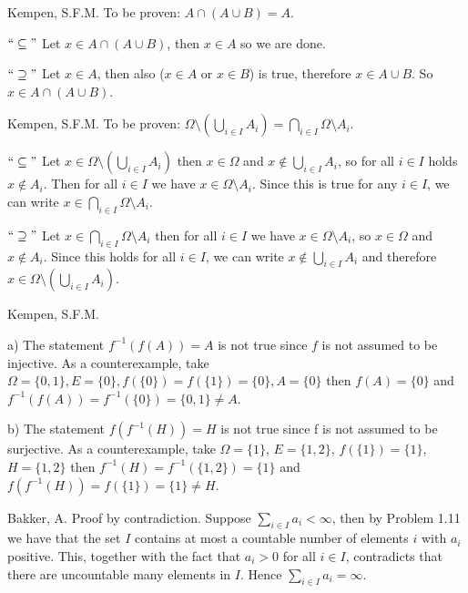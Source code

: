 \begin{solution}[1.2]{Kempen, S.F.M.} To be proven: $A\cap (A\cup B) = A$. 

\noindent $``\subseteq"$ Let $x\in A\cap (A\cup B)$, then $x\in A$ so we are done.

\noindent $``\supseteq"$ Let $x\in A$, then also ($x\in A$ or $x\in B$) is true, therefore $x\in A\cup B$. So $x\in A\cap (A\cup B)$. 
\end{solution}

\begin{solution}[1.5]{Kempen, S.F.M.} To be proven: $\Omega \setminus \left(\bigcup_{i\in I} A_i \right) = \bigcap_{i\in I} \Omega \setminus A_i$. 

\noindent $``\subseteq"$ Let $x\in \Omega \setminus \left(\bigcup_{i\in I} A_i \right)$ then $x\in \Omega$ and $x\notin \bigcup_{i\in I} A_i$, so for all $i \in I $ holds $x\notin A_i$. Then for all $i \in I$ we have $x\in \Omega\setminus A_i$. Since this is true for any $i\in I$, we can write $x\in \bigcap_{i\in I} \Omega \setminus A_i$. 

\noindent $``\supseteq"$ Let $x\in \bigcap_{i\in I} \Omega \setminus A_i$ then for all $i\in I$ we have $x\in \Omega\setminus A_i$, so $x\in \Omega$ and $x\notin A_i$. Since this holds for all $i\in I$, we can write $x\notin \bigcup_{i\in I} A_i $ and therefore $x\in \Omega \setminus \left(\bigcup_{i\in I} A_i \right)$.
\end{solution}

\begin{solution}[1.8]{Kempen, S.F.M.} 
    
\noindent a) The statement $f^{-1}(f(A)) = A$ is not true since $f$ is not assumed to be injective. As a counterexample, take $\Omega = \{0,1\}, E = \{0\}, f(\{0\}) = f(\{1\}) = \{0\}, A = \{0\}$ then $f(A) = \{0\}$ and $f^{-1}(f(A)) = f^{-1}(\{0\}) = \{0,1\} \neq A$.

\noindent b) The statement $f(f^{-1}(H)) = H$ is not true since f is not assumed to be surjective. As a counterexample, take $\Omega = \{1\}$, $E = \{1,2\}$, $f(\{1\}) = \{1\}$, $H = \{1,2\}$ then $f^{-1}(H) = f^{-1}(\{1,2\}) = \{1\}$ and $f(f^{-1}(H)) = f(\{1\}) = \{1\} \neq H$.
\end{solution}

\begin{solution}[1.12]{Bakker, A.}
	Proof by contradiction. Suppose $\sum_{i\in I}a_i < \infty$, then by Problem 1.11 we have that the set $I$ contains at most a countable number of elements $i$ with $a_i$ positive. This, together with the fact that $a_i>0$ for all $i\in I$, contradicts that there are uncountable many elements in $I$. Hence  $\sum_{i\in I}a_i = \infty$.
\end{solution}